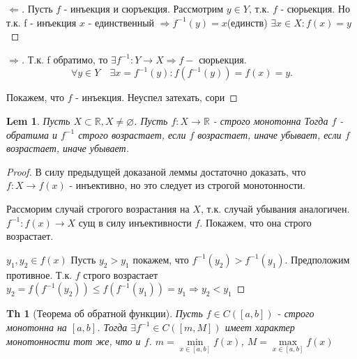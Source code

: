 \documentclass[a5paper, 10pt]{article}
\theoremstyle{plain}
\newtheorem*{theorem_}{Th}
\newtheorem{lemma}{Lem}
\newcommand{\R}{\mathbb R}
\newcommand{\Larrow}{\Leftarrow}
\newcommand{\Rarrow}{\Rightarrow}
\begin{document}
    \begin{proof}[$ \Larrow $]
        Пусть $ f $ - инъекция и сюръекция. \newline
        Рассмотрим $ y \in Y $, т.к. $ f $ - сюрьекция. \newline
        Но т.к. f - инъекция $ x $ - единственный $ \Rarrow f^{-1}(y) = x $(единств)
        $ \exists x \in X: f(x) = y $
    \end{proof}

    \begin{proof}[$ \Rarrow $]
        Т.к. f обратимо, то $ \exists f^{-1}: Y \to X \Rarrow f - $ сюрьекция.
        \[
            \forall y \in Y \quad \exists x =  f ^{-1}(y): f(f ^{-1}(y)) = f(x) = y
        .\]

        Покажем, что $ f $ - инъекция.
        Неуспел затехать, сори
    \end{proof}

    \begin{lemma}
        Пусть $ X \subset \R, X \neq \varnothing $. \newline
        Пусть $ f: X \to \R $ - строго монотонна \newline
        Тогда $ f $ - обратима и $ f^{-1} $ строго возрастает, если $ f $ возрастает,
        иначе убывает, если $ f $ возрастает,
        иначе убывает.
    \end{lemma}

    \begin{proof}
        В силу предыдущей доказаной леммы достаточно доказать, что $ f: X \to f(x) $ - инъективно,
        но это следует из строгой монотонности.

        Рассморим случай строгого возрастания на $ X $, т.к. случай убывания аналогичен.
        $ f^{-1}: f(x) \to X $ сущ в силу инъективности $ f $.
        Покажем, что она строго возрастает.

        $ y_1, y_2 \in f(x) $
        Пусть $ y_2 > y_1 $
        покажем, что $ f ^{-1}(y_2) > f ^{-1}(y_1) $.
        Предположим противное.
        Т.к. $ f $ строго возрастает $ y_2 = f(f ^{-1}(y_2)) \leq f(f ^{-1}(y_1)) = y_1 \Rarrow
        y_2 < y_1 $
    \end{proof}

    \begin{theorem_}[Теорема об обратной функции]
        Пусть $ f \in C([a, b]) $ - строго монотонна на $ [a, b] $.
        Тогда $ \exists f ^{-1} \in C([m, M]) $ имеет характер монотонности тот же, что и $ f $.
        $ m = \min\limits_{x \in [a, b] } f(x) $,
        $ M = \max\limits_{x \in [a, b] } f(x) $
    \end{theorem_}
\end{document}
